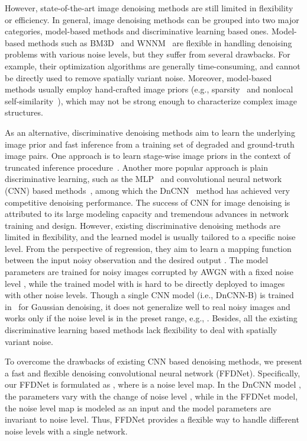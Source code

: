 \documentclass[journal]{IEEEtran}
\begin{document}
However, state-of-the-art image denoising methods are still limited in flexibility or efficiency. In general, image denoising methods can be grouped into two major categories, model-based methods and discriminative learning based ones. Model-based methods such as BM3D~\cite{dabov2007image} and WNNM~\cite{gu2014weighted} are flexible in handling denoising problems with various noise levels, but they suffer from several drawbacks. For example, their optimization algorithms are generally time-consuming, and cannot be directly used to remove spatially variant noise. Moreover,
model-based methods usually employ hand-crafted image priors (e.g., sparsity~\cite{elad2006image,mairal2008sparse} and nonlocal self-similarity~\cite{buades2005non,mairal2009non,dong2013nonlocally}), which may not be strong enough to characterize complex image structures.


As an alternative, discriminative denoising methods aim to learn the underlying image prior and fast inference from a training set of degraded and ground-truth image pairs. One approach is to learn stage-wise image priors in the context of truncated inference procedure~\cite{chen2015trainable}.
Another more popular approach is plain discriminative learning, such as the MLP~\cite{burger2012image} and convolutional neural network (CNN) based methods~\cite{jain2009natural,zhang2017beyond}, among which the DnCNN~\cite{zhang2017beyond} method has achieved very competitive denoising performance. The success of CNN for image denoising is attributed to its large modeling capacity and tremendous advances in network training and design.
However, existing discriminative denoising methods are limited in flexibility, and the learned model is usually tailored to a specific noise level. From the perspective of regression, they aim to learn a mapping function
 between the input noisy observation  and the desired output . The model parameters  are trained for noisy images corrupted by AWGN with a fixed noise level , while the trained model with  is hard to be directly deployed to images with other noise levels. Though a single CNN model (i.e., DnCNN-B) is trained in~\cite{zhang2017beyond} for Gaussian denoising, it does not generalize well to real noisy images and works only if the noise level is in the preset range, e.g., . Besides, all the existing discriminative learning based methods lack flexibility to deal with spatially variant noise.


To overcome the drawbacks of existing CNN based denoising methods, we present a fast and flexible denoising convolutional neural network (FFDNet). Specifically, our FFDNet is formulated as , where  is a noise level map. In the DnCNN model , the parameters  vary with the change of noise level , while in the FFDNet model, the noise level map is modeled as an input and the model parameters  are invariant to noise level. Thus, FFDNet provides a flexible way to handle different noise levels with a single network.
\end{document}
